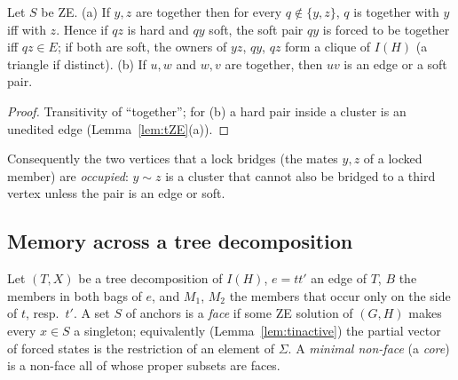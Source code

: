 \begin{lemma}\label{lem:trigid}
Let $S$ be ZE. (a) If $y,z$ are together then for every $q\notin\{y,z\}$, $q$ is together with $y$ iff with $z$. Hence if $qz$ is hard and $qy$ soft, the soft pair $qy$ is forced to be together iff $qz\in E$; if both are soft, the owners of $yz$, $qy$, $qz$ form a clique of $I(H)$ (a triangle if distinct). (b) If $u,w$ and $w,v$ are together, then $uv$ is an edge or a soft pair.
\end{lemma}
\begin{proof}
Transitivity of ``together''; for (b) a hard pair inside a cluster is an unedited edge (Lemma~\ref{lem:tZE}(a)).
\end{proof}
Consequently the two vertices that a lock bridges (the mates $y,z$ of a locked member) are \emph{occupied}: $y\sim z$ is a cluster that cannot also be bridged to a third vertex unless the pair is an edge or soft.

\subsection{Memory across a tree decomposition}
Let $(T,X)$ be a tree decomposition of $I(H)$, $e=tt'$ an edge of $T$, $B$ the members in both bags of $e$, and $M_1$, $M_2$ the members that occur only on the side of $t$, resp.\ $t'$.
A set $S$ of anchors is a \emph{face} if some ZE solution of $(G,H)$ makes every $x\in S$ a singleton; equivalently (Lemma~\ref{lem:tinactive}) the partial vector of forced states is the restriction of an element of $\Sigma$. A \emph{minimal non-face} (a \emph{core}) is a non-face all of whose proper subsets are faces.

